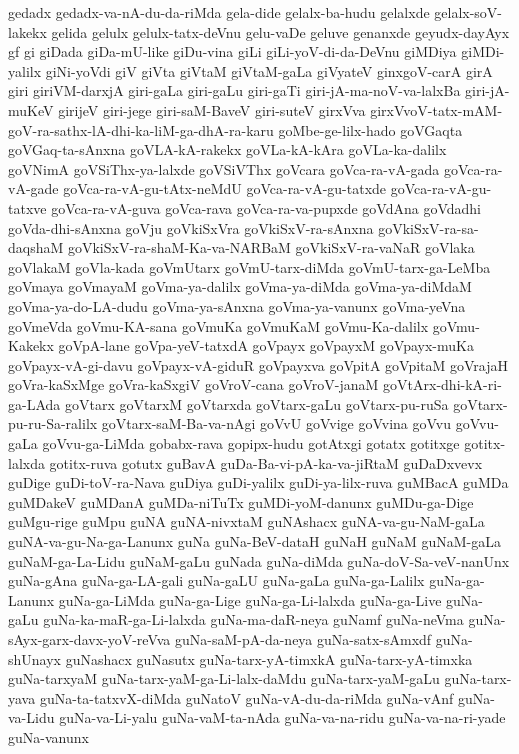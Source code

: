 {gedadx
gedadx-va-nA-du-da-riMda
gela-dide
gelalx-ba-hudu
gelalxde
gelalx-soV-lakekx
gelida
gelulx
gelulx-tatx-deVnu
gelu-vaDe
geluve
genanxde
geyudx-dayAyx
gf
gi
giDada
giDa-mU-like
giDu-vina
giLi
giLi-yoV-di-da-DeVnu
giMDiya
giMDi-yalilx
giNi-yoVdi
giV
giVta
giVtaM
giVtaM-gaLa
giVyateV
ginxgoV-carA
girA
giri
giriVM-darxjA
giri-gaLa
giri-gaLu
giri-gaTi
giri-jA-ma-noV-va-lalxBa
giri-jA-muKeV
girijeV
giri-jege
giri-saM-BaveV
giri-suteV
girxVva
girxVvoV-tatx-mAM-goV-ra-sathx-lA-dhi-ka-liM-ga-dhA-ra-karu
goMbe-ge-lilx-hado
goVGaqta
goVGaq-ta-sAnxna
goVLA-kA-rakekx
goVLa-kA-kAra
goVLa-ka-dalilx
goVNimA
goVSiThx-ya-lalxde
goVSiVThx
goVcara
goVca-ra-vA-gada
goVca-ra-vA-gade
goVca-ra-vA-gu-tAtx-neMdU
goVca-ra-vA-gu-tatxde
goVca-ra-vA-gu-tatxve
goVca-ra-vA-guva
goVca-rava
goVca-ra-va-pupxde
goVdAna
goVdadhi
goVda-dhi-sAnxna
goVju
goVkiSxVra
goVkiSxV-ra-sAnxna
goVkiSxV-ra-sa-daqshaM
goVkiSxV-ra-shaM-Ka-va-NARBaM
goVkiSxV-ra-vaNaR
goVlaka
goVlakaM
goVla-kada
goVmUtarx
goVmU-tarx-diMda
goVmU-tarx-ga-LeMba
goVmaya
goVmayaM
goVma-ya-dalilx
goVma-ya-diMda
goVma-ya-diMdaM
goVma-ya-do-LA-dudu
goVma-ya-sAnxna
goVma-ya-vanunx
goVma-yeVna
goVmeVda
goVmu-KA-sana
goVmuKa
goVmuKaM
goVmu-Ka-dalilx
goVmu-Kakekx
goVpA-lane
goVpa-yeV-tatxdA
goVpayx
goVpayxM
goVpayx-muKa
goVpayx-vA-gi-davu
goVpayx-vA-giduR
goVpayxva
goVpitA
goVpitaM
goVrajaH
goVra-kaSxMge
goVra-kaSxgiV
goVroV-cana
goVroV-janaM
goVtArx-dhi-kA-ri-ga-LAda
goVtarx
goVtarxM
goVtarxda
goVtarx-gaLu
goVtarx-pu-ruSa
goVtarx-pu-ru-Sa-ralilx
goVtarx-saM-Ba-va-nAgi
goVvU
goVvige
goVvina
goVvu
goVvu-gaLa
goVvu-ga-LiMda
gobabx-rava
gopipx-hudu
gotAtxgi
gotatx
gotitxge
gotitx-lalxda
gotitx-ruva
gotutx
guBavA
guDa-Ba-vi-pA-ka-va-jiRtaM
guDaDxvevx
guDige
guDi-toV-ra-Nava
guDiya
guDi-yalilx
guDi-ya-lilx-ruva
guMBacA
guMDa
guMDakeV
guMDanA
guMDa-niTuTx
guMDi-yoM-danunx
guMDu-ga-Dige
guMgu-rige
guMpu
guNA
guNA-nivxtaM
guNAshacx
guNA-va-gu-NaM-gaLa
guNA-va-gu-Na-ga-Lanunx
guNa
guNa-BeV-dataH
guNaH
guNaM
guNaM-gaLa
guNaM-ga-La-Lidu
guNaM-gaLu
guNada
guNa-diMda
guNa-doV-Sa-veV-nanUnx
guNa-gAna
guNa-ga-LA-gali
guNa-gaLU
guNa-gaLa
guNa-ga-Lalilx
guNa-ga-Lanunx
guNa-ga-LiMda
guNa-ga-Lige
guNa-ga-Li-lalxda
guNa-ga-Live
guNa-gaLu
guNa-ka-maR-ga-Li-lalxda
guNa-ma-daR-neya
guNamf
guNa-neVma
guNa-sAyx-garx-davx-yoV-reVva
guNa-saM-pA-da-neya
guNa-satx-sAmxdf
guNa-shUnayx
guNashacx
guNasutx
guNa-tarx-yA-timxkA
guNa-tarx-yA-timxka
guNa-tarxyaM
guNa-tarx-yaM-ga-Li-lalx-daMdu
guNa-tarx-yaM-gaLu
guNa-tarx-yava
guNa-ta-tatxvX-diMda
guNatoV
guNa-vA-du-da-riMda
guNa-vAnf
guNa-va-Lidu
guNa-va-Li-yalu
guNa-vaM-ta-nAda
guNa-va-na-ridu
guNa-va-na-ri-yade
guNa-vanunx
}
